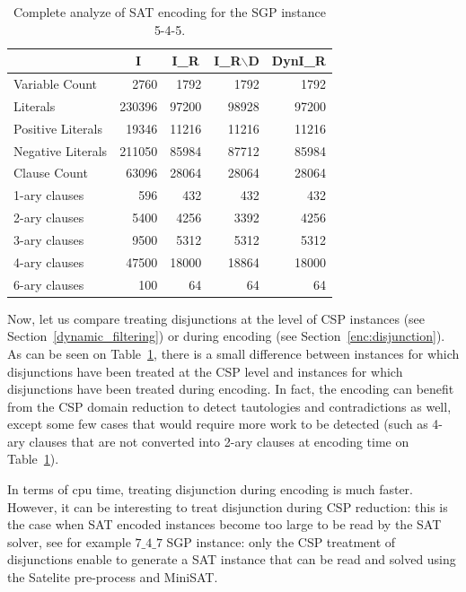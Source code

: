 \documentclass[3p,authoryear,times]{elsarticle}
\begin{document}
\begin{table}
\begin{center}
\caption{Complete analyze of SAT encoding for the SGP instance 5-4-5.}
\label{tab:545}
\begin{tabular}{|l|r|r|r|r|}
\hline
&\multicolumn{1}{c|}{I}&\multicolumn{1}{c|}{I\_R}&\multicolumn{1}{c|}{I\_R$\backslash$D}&\multicolumn{1}{c|}{DynI\_R}\\ \hline \hline
Variable Count&2760&1792&1792&1792\\ \hline
Literals&230396&97200&98928&97200\\ \hline
Positive Literals&19346&11216&11216&11216\\ \hline
Negative Literals&211050&85984&87712&85984\\ \hline \hline
Clause Count&63096&28064&28064&28064\\ \hline
1-ary clauses&596&432&432&432\\ \hline
2-ary clauses&5400&4256&3392&4256\\ \hline
3-ary clauses&9500&5312&5312&5312\\ \hline
4-ary clauses&47500&18000&18864&18000\\ \hline
6-ary clauses&100&64&64&64\\ \hline
\end{tabular}
\end{center}
\end{table}

Now, let us compare treating disjunctions at the level of CSP instances (see Section~\ref{dynamic_filtering}) or during encoding (see Section~\ref{enc:disjunction}). As can be seen on Table~\ref{tab:545}, there is a small difference between instances for which disjunctions have been treated at the CSP level and instances for which disjunctions have been treated during encoding. In fact, the encoding can benefit from the CSP domain reduction to detect tautologies and contradictions as well, except some few cases that would require more work to be detected (such as 4-ary clauses that are not converted into 2-ary clauses at encoding time on Table~\ref{tab:545}).

In terms of cpu time, treating disjunction during encoding is much faster. However, it can be interesting to treat disjunction during CSP reduction: this is the case when SAT encoded instances become too large to be read by the SAT solver, see for example $7\_4\_7$ SGP instance: only the CSP treatment of disjunctions enable to generate a SAT instance that can be read and solved using the Satelite pre-process and MiniSAT.
\end{document}
